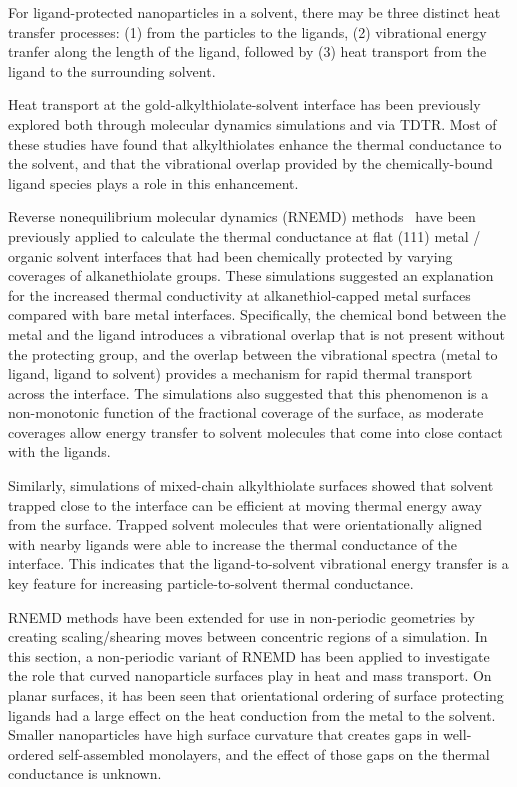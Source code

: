 For ligand-protected nanoparticles in a solvent, there may be three
distinct heat transfer processes: (1) from the particles to the
ligands, (2) vibrational energy tranfer along the length of the
ligand, followed by (3) heat transport from the ligand to the
surrounding solvent.\cite{Ge:2006kx}

Heat transport at the gold-alkylthiolate-solvent interface has been
previously explored both through molecular dynamics simulations and
via
TDTR.\cite{Kikugawa:2009vn,Kuang:2011ef,Stocker:2013cl,Tian:2015uq}
Most of these studies have found that alkylthiolates enhance the
thermal conductance to the solvent, and that the vibrational overlap
provided by the chemically-bound ligand species plays a role in this
enhancement.

Reverse nonequilibrium molecular dynamics (RNEMD)
methods~\cite{Muller-Plathe:1997wq} have been previously applied to
calculate the thermal conductance at flat (111) metal / organic
solvent interfaces that had been chemically protected by varying
coverages of alkanethiolate groups.\cite{Kuang:2011ef} These
simulations suggested an explanation for the increased thermal
conductivity at alkanethiol-capped metal surfaces compared with bare
metal interfaces.  Specifically, the chemical bond between the metal
and the ligand introduces a vibrational overlap that is not present
without the protecting group, and the overlap between the vibrational
spectra (metal to ligand, ligand to solvent) provides a mechanism for
rapid thermal transport across the interface. The simulations also
suggested that this phenomenon is a non-monotonic function of the
fractional coverage of the surface, as moderate coverages allow energy
transfer to solvent molecules that come into close contact with the
ligands.

Similarly, simulations of mixed-chain alkylthiolate surfaces
showed that solvent trapped close to the interface can be efficient at
moving thermal energy away from the surface.\cite{Stocker:2013cl}
Trapped solvent molecules that were orientationally aligned with
nearby ligands were able to increase the thermal conductance of the
interface.  This indicates that the ligand-to-solvent vibrational
energy transfer is a key feature for increasing particle-to-solvent
thermal conductance.

RNEMD methods have been extended for use in non-periodic geometries
by creating scaling/shearing moves between concentric regions of a
simulation.\cite{Stocker:2014qq} In this section, a
non-periodic variant of RNEMD has been applied to investigate the role that
curved nanoparticle surfaces play in heat and mass transport.  On
planar surfaces, it has been seen that orientational ordering of surface
protecting ligands had a large effect on the heat conduction from the
metal to the solvent.\cite{Stocker:2013cl}
 Smaller nanoparticles have high surface curvature that creates gaps in well-ordered self-assembled monolayers,
and the effect of those gaps on the thermal conductance is unknown.


